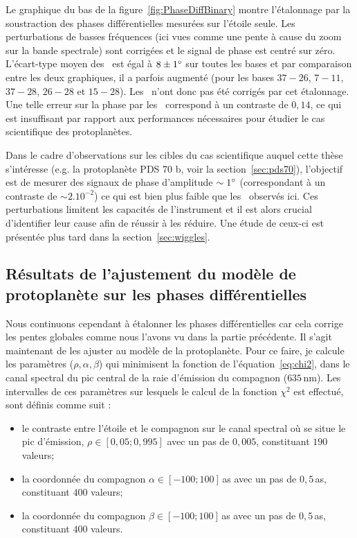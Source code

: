 Le graphique du bas de la figure~\ref{fig:PhaseDiffBinary} montre l'étalonnage par la soustraction des phases différentielles mesurées sur l'étoile seule. Les perturbations de basses fréquences (ici vues comme une pente à cause du zoom sur la bande spectrale) sont corrigées et le signal de phase est centré sur zéro. L'écart-type moyen des \wiggles~est égal à $8 \pm 1^{\circ}$ sur toutes les bases et par comparaison entre les deux graphiques, il a parfois augmenté (pour les bases $37-26$, $7-11$, $37-28$, $26-28$ et $15-28$). Les \wiggles~n'ont donc pas été corrigés par cet étalonnage. Une telle erreur sur la phase par les \wiggles~correspond à un contraste de $0,14$, ce qui est insuffisant par rapport aux performances nécessaires pour étudier le cas scientifique des protoplanètes.

Dans le cadre d'observations sur les cibles du cas scientifique auquel cette thèse s'intéresse (e.g. la protoplanète PDS 70 b, voir la section~\ref{sec:pds70}), l'objectif est de mesurer des signaux de phase d'amplitude $\sim 1^{\circ}$ (correspondant à un contraste de $\sim 2.10^{-2}$) ce qui est bien plus faible que les \wiggles~observés ici. Ces perturbations limitent les capacités de l'instrument et il est alors crucial d'identifier leur cause afin de réussir à les réduire. Une étude de ceux-ci est présentée plus tard dans la section~\ref{sec:wiggles}.


\subsection{Résultats de l'ajustement du modèle de protoplanète sur les phases différentielles}

Nous continuons cependant à étalonner les phases différentielles car cela corrige les pentes globales comme nous l'avons vu dans la partie précédente. Il s'agit maintenant de les ajuster au modèle de la protoplanète. Pour ce faire, je calcule les paramètres ($\rho, \alpha, \beta$) qui minimisent la fonction de l'équation~\ref{eq:chi2}, dans le canal spectral du pic central de la raie d'émission du compagnon ($635 \,$nm). Les intervalles de ces paramètres sur lesquels le calcul de la fonction $\chi^2$ est effectué, sont définis comme suit :

\begin{itemize}
    \item le contraste entre l'étoile et le compagnon sur le canal spectral où se situe le pic d'émission, $\rho \in [0,05; 0,995]$ avec un pas de $0,005$, constituant $190$ valeurs;
    \item la coordonnée du compagnon $\alpha \in [-100; 100]\,$as avec un pas de $0,5 \,$as, constituant $400$ valeurs;
    \item la coordonnée du compagnon $\beta \in [-100; 100]\,$as avec un pas de $0,5 \,$as, constituant $400$ valeurs.
\end{itemize}

